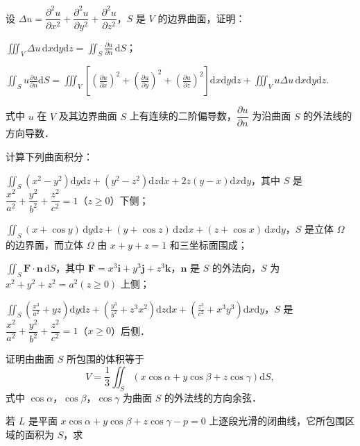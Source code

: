\begin{xiti}
\item 设 $\Delta u=\dfrac{\partial^{2}u}{\partial x^{2}}+\dfrac{\partial^{2}u}{\partial y^{2}}+\dfrac{\partial^{2}u}{\partial z^{2}}$，$S$ 是 $V$ 的边界曲面，证明：
\begin{ziti}
\item $\displaystyle\iiint_{V}\Delta u\,\mathrm{d}x\mathrm{d}y\mathrm{d}z=\iint_{S}\frac{\partial u}{\partial n}\,\mathrm{d}S$；
\item $\displaystyle\iint_{S}u\frac{\partial u}{\partial n}\mathrm{d}S=\iiint_{V}\left[\left(\frac{\partial u}{\partial x}\right)^{2}+\left(\frac{\partial u}{\partial y}\right)^{2}+\left(\frac{\partial u}{\partial z}\right)^{2}\right]\mathrm{d}x\mathrm{d}y\mathrm{d}z+\iiint_{V}u\Delta u\,\mathrm{d}x\mathrm{d}y\mathrm{d}z$.
\end{ziti}
式中 $u$ 在 $V$ 及其边界曲面 $S$ 上有连续的二阶偏导数，$\dfrac{\partial u}{\partial n}$ 为沿曲面 $S$ 的外法线的方向导数．
\item 计算下列曲面积分：
\begin{ziti}
\item $\displaystyle\iint_{S}(x^{2}-y^{2})\mathrm{d}y\mathrm{d}z+(y^{2}-z^{2})\mathrm{d}z\mathrm{d}x+2z(y-x)\mathrm{d}x\mathrm{d}y$，其中 $S$ 是 $\dfrac{x^{2}}{a^{2}}+\dfrac{y^{2}}{b^{2}}+\dfrac{z^{2}}{c^{2}}=1$（$z\geqslant 0$）下侧；
\item $\displaystyle\iint_{S}(x+\cos y)\,\mathrm{d}y\mathrm{d}z+(y+\cos z)\,\mathrm{d}z\mathrm{d}x+(z+\cos x)\,\mathrm{d}x\mathrm{d}y$，$S$ 是立体 $\Omega$ 的边界面，而立体 $\Omega$ 由 $x+y+z=1$ 和三坐标面围成；
\item $\displaystyle\iint_{S}\bm{F}\cdot\bm{n}\,\mathrm{d}S$，其中 $\bm{F}=x^{3}\bm{i}+y^{3}\bm{j}+z^{3}\bm{k}$，$\bm{n}$ 是 $S$ 的外法向，$S$ 为 $x^{2}+y^{2}+z^{2}=a^{2}(z\geqslant 0)$ 上侧；
\item $\displaystyle\iint_{S}\left(\frac{x^{3}}{a^{2}}+yz\right)\mathrm{d}y\mathrm{d}z+\left(\frac{y^{3}}{b^{2}}+z^{3}x^{2}\right)\mathrm{d}z\mathrm{d}x+\left(\frac{z^{3}}{c^{2}}+x^{3}y^{3}\right)\mathrm{d}x\mathrm{d}y$，$S$ 是 $\dfrac{x^{2}}{a^{2}}+\dfrac{y^{2}}{b^{2}}+\dfrac{z^{2}}{c^{2}}=1$（$x\geqslant 0$）后侧．
\end{ziti}
\item 证明由曲面 $S$ 所包围的体积等于
\[
V=\frac{1}{3}\iint_{S}\left(x\cos\alpha+y\cos\beta+z\cos\gamma\right)\mathrm{d}S,
\]
式中 $\cos\alpha$，$\cos\beta$，$\cos\gamma$ 为曲面 $S$ 的外法线的方向余弦．
\item 若 $L$ 是平面 $x\cos\alpha+y\cos\beta+z\cos\gamma-p=0$ 上逐段光滑的闭曲线，它所包围区域的面积为 $S$，求

\end{xiti}
